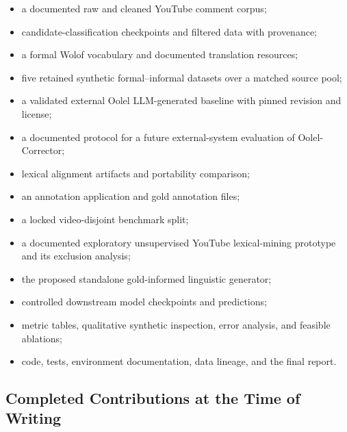 \documentclass[12pt, a4paper, twoside, openany]{report}
\begin{document}
\begin{itemize}
	\item a documented raw and cleaned YouTube comment corpus;

	\item candidate-classification checkpoints and filtered data with provenance;

	\item a formal Wolof vocabulary and documented translation resources;

	\item five retained synthetic formal--informal datasets over a matched source pool;

	\item a validated external Oolel LLM-generated baseline with pinned revision and license;

	\item a documented protocol for a future external-system evaluation of Oolel-Corrector;

	\item lexical alignment artifacts and portability comparison;

	\item an annotation application and gold annotation files;

	\item a locked video-disjoint benchmark split;

	\item a documented exploratory unsupervised YouTube lexical-mining prototype and its exclusion analysis;

	\item the proposed standalone gold-informed linguistic generator;

	\item controlled downstream model checkpoints and predictions;

	\item metric tables, qualitative synthetic inspection, error analysis, and feasible ablations;

	\item code, tests, environment documentation, data lineage, and the final report.
\end{itemize}


\subsection{Completed Contributions at the Time of Writing}
\end{document}
